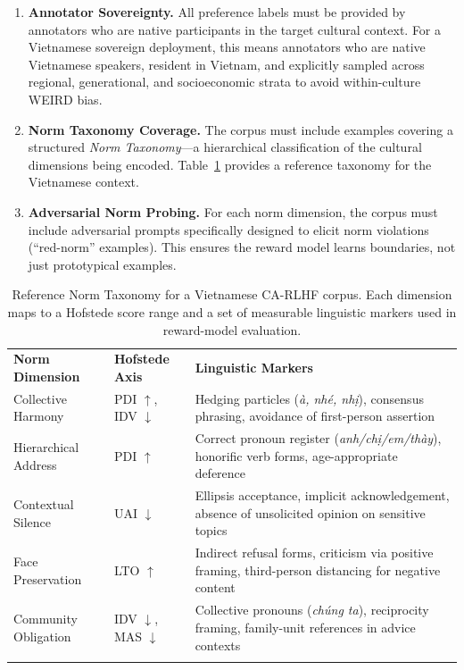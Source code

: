 \begin{enumerate}
  \item \textbf{Annotator Sovereignty.}
    All preference labels must be provided by annotators who are
    native participants in the target cultural context.
    For a Vietnamese sovereign deployment, this means annotators
    who are native Vietnamese speakers, resident in Vietnam, and
    explicitly sampled across regional, generational, and
    socioeconomic strata to avoid within-culture WEIRD bias.

  \item \textbf{Norm Taxonomy Coverage.}
    The corpus must include examples covering a structured
    \emph{Norm Taxonomy}---a hierarchical classification of the
    cultural dimensions being encoded.
    Table~\ref{tab:norm-taxonomy} provides a reference taxonomy
    for the Vietnamese context.

  \item \textbf{Adversarial Norm Probing.}
    For each norm dimension, the corpus must include adversarial
    prompts specifically designed to elicit norm violations
    (``red-norm'' examples).
    This ensures the reward model learns boundaries, not just
    prototypical examples.
\end{enumerate}

\begin{table}[ht]
\centering
\caption{Reference Norm Taxonomy for a Vietnamese CA-RLHF corpus.
  Each dimension maps to a Hofstede score range and a set of
  measurable linguistic markers used in reward-model evaluation.}
\label{tab:norm-taxonomy}
\begin{tabular}{p{3.2cm}p{2.2cm}p{5.8cm}}
\hline\noalign{\smallskip}
\textbf{Norm Dimension} &
\textbf{Hofstede Axis} &
\textbf{Linguistic Markers} \\
\noalign{\smallskip}\svhline\noalign{\smallskip}
Collective Harmony
  & PDI $\uparrow$, IDV $\downarrow$
  & Hedging particles (\textit{\`{a}, nh\'{e}, nh\d{i}}),
    consensus phrasing, avoidance of first-person assertion \\[4pt]
Hierarchical Address
  & PDI $\uparrow$
  & Correct pronoun register (\textit{anh/ch\d{i}/em/th\`{a}y}),
    honorific verb forms, age-appropriate deference \\[4pt]
Contextual Silence
  & UAI $\downarrow$
  & Ellipsis acceptance, implicit acknowledgement, absence of
    unsolicited opinion on sensitive topics \\[4pt]
Face Preservation
  & LTO $\uparrow$
  & Indirect refusal forms, criticism via positive framing,
    third-person distancing for negative content \\[4pt]
Community Obligation
  & IDV $\downarrow$, MAS $\downarrow$
  & Collective pronouns (\textit{ch\'{u}ng ta}), reciprocity
    framing, family-unit references in advice contexts \\
\noalign{\smallskip}\hline\noalign{\smallskip}
\end{tabular}
\end{table}

